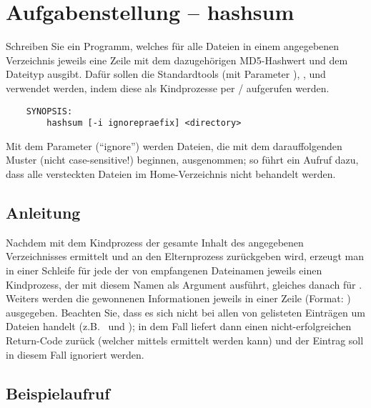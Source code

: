




\section*{Aufgabenstellung -- hashsum}

Schreiben Sie ein Programm, welches für alle Dateien in einem angegebenen
Verzeichnis jeweils eine Zeile mit dem dazugehörigen MD5-Hashwert und dem
Dateityp ausgibt. Dafür sollen die Standardtools  (mit Parameter
), , und  verwendet werden, indem
diese als Kindprozesse per / aufgerufen
werden.

\begin{verbatim}
    SYNOPSIS:
        hashsum [-i ignorepraefix] <directory>
\end{verbatim}

Mit dem Parameter  (``ignore'') werden Dateien, die mit dem
darauffolgenden Muster (nicht case-sensitive!) beginnen, ausgenommen;
so führt ein Aufruf  dazu, dass alle versteckten
Dateien im Home-Verzeichnis nicht behandelt werden.

\subsection*{Anleitung}
Nachdem mit dem Kindprozess  der gesamte Inhalt des angegebenen
Verzeichnisses ermittelt und an den Elternprozess zurückgeben wird, erzeugt man
in einer Schleife für jede der von  empfangenen Dateinamen jeweils
einen Kindprozess, der  mit diesem Namen als Argument ausführt,
gleiches danach für . Weiters werden die gewonnenen Informationen
jeweils in einer Zeile (Format: )
ausgegeben. Beachten Sie, dass es sich nicht bei allen von 
gelisteten Einträgen um Dateien handelt (z.B.\  und
); in dem Fall liefert dann  einen
nicht-erfolgreichen Return-Code zurück (welcher mittels
 ermittelt werden kann) und der Eintrag
soll in diesem Fall ignoriert werden.

\subsection*{Beispielaufruf}

